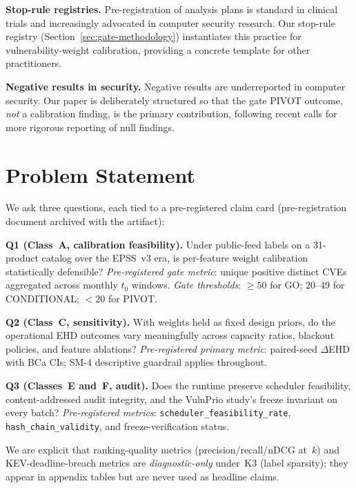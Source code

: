 \documentclass[conference]{IEEEtran}
\begin{document}
\textbf{Stop-rule registries.} Pre-registration of analysis plans is
standard in clinical trials and increasingly advocated in computer
security research. Our stop-rule registry (Section~\ref{sec:gate-methodology})
instantiates this practice for vulnerability-weight calibration, providing a
concrete template for other practitioners.

\textbf{Negative results in security.} Negative results are underreported in
computer security. Our paper is deliberately structured so that the gate
PIVOT outcome, \emph{not} a calibration finding, is the primary
contribution, following recent calls for more rigorous reporting of null
findings.

\section{Problem Statement}
\label{sec:problem-statement}

We ask three questions, each tied to a pre-registered claim card
(pre-registration document archived with the artifact):

\textbf{Q1 (Class~A, calibration feasibility).}
Under public-feed labels on a 31-product catalog over the EPSS~v3
era, is per-feature weight calibration statistically defensible?
\emph{Pre-registered gate metric}: unique positive distinct CVEs
aggregated across monthly $t_0$ windows.
\emph{Gate thresholds}: ${\geq}50$ for GO; $20$--$49$ for CONDITIONAL;
$<20$ for PIVOT.

\textbf{Q2 (Class~C, sensitivity).}
With weights held as fixed design priors, do the operational EHD
outcomes vary meaningfully across capacity ratios, blackout policies,
and feature ablations?
\emph{Pre-registered primary metric}: paired-seed $\Delta$EHD with BCa
CIs; SM-4 descriptive guardrail applies throughout.

\textbf{Q3 (Classes~E and~F, audit).}
Does the runtime preserve scheduler feasibility, content-addressed
audit integrity, and the VulnPrio study's freeze invariant on every batch?
\emph{Pre-registered metrics}: \texttt{scheduler\_feasibility\_rate},
\texttt{hash\_chain\_validity}, and freeze-verification status.

We are explicit that ranking-quality metrics (precision/recall/nDCG at~$k$)
and KEV-deadline-breach metrics are \emph{diagnostic-only} under~K3
(label sparsity); they appear in appendix tables but are never used
as headline claims.

\end{document}
